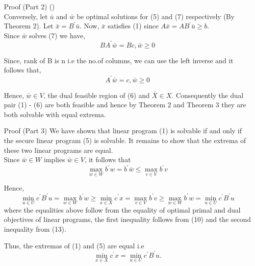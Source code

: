 \documentclass[9pt]{beamer}
\begin{document}
\begin{frame}{Proof (Part 2)}
(\Leftarrow)\\
Conversely, let $ \bar{u} $ and $ \bar{w} $ be optimal solutions for (5) and (7) respectively (By Theorem 2). Let $ \bar{x}=B^{\prime} \bar{u} $. Now, $ \bar{x} $ satisfies (1) since $ A \bar{x} = A B^{\prime} \bar{u} \geq b $. \\
Since $ \bar{w} $ solves (7) we have, 
\begin{equation}
B A^{\prime} \bar{w}=B c, \bar{w} \geq 0 
\end{equation}

Since, rank of B is n i.e the no.of columns, we can use the left inverse and it follows that, 
\begin{equation}
A^{\prime} \bar{w}=c, \bar{w} \geq 0
\end{equation}

Hence, $ \bar{w} \in V $, the dual feasible region of (6) and $ \bar{X} \in X $. Consequently the dual pair (1) - (6) are both feasible and hence by Theorem 2 and Theorem 3 they are both solvable with equal extrema.
\end{frame}

\begin{frame}{Proof (Part 3)}
We have shown that linear program (1) is solvable if and only if the secure linear program (5) is solvable. It remains to show that the extrema of these two linear programs are equal.\\

\vspace{0.1cm}
Since $ \bar{w} \in W $ implies $ \bar{w} \in V $, it follows that
\begin{equation}
\max _{w \in W} b^{\prime} w=b^{\prime} \bar{w} \leq \max _{v \in V} b^{\prime} v
\end{equation}

Hence, 
\begin{equation}
\min _{u \in U} c^{\prime} B^{\prime} u=\max _{w \in W} b^{\prime} w \geq \min _{x \in X} c^{\prime} x=\max _{v \in V} b^{\prime} v \geq \max _{w \in W} b^{\prime} w=\min _{u \in U} c^{\prime} B^{\prime} u
\end{equation}
where the equalities above follow from the equality of optimal primal and dual objectives of linear programs, the first inequality follows from (10) and the second inequality from (13).\\
\vspace{0.1cm}

Thus, the extremas of (1) and (5) are equal i.e 
$$ \min _{x \in X} c^{\prime} x=\min _{u \in U} c^{\prime} B^{\prime} u. $$
\end{frame}
\end{document}

